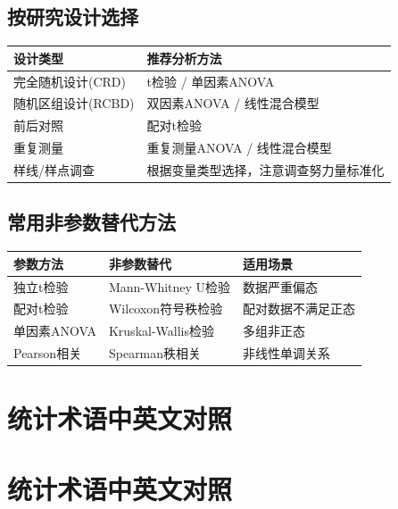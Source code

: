 \documentclass[
  letterpaper,
]{scrbook}
\newcounter{none} %
\begin{document}
\section{按研究设计选择}\label{ux6309ux7814ux7a76ux8bbeux8ba1ux9009ux62e9}

{\def\LTcaptype{none} %
\begin{longtable}[]{@{}ll@{}}
\toprule\noalign{}
设计类型 & 推荐分析方法 \\
\midrule\noalign{}
\endhead
\bottomrule\noalign{}
\endlastfoot
完全随机设计(CRD) & t检验 / 单因素ANOVA \\
随机区组设计(RCBD) & 双因素ANOVA / 线性混合模型 \\
前后对照 & 配对t检验 \\
重复测量 & 重复测量ANOVA / 线性混合模型 \\
样线/样点调查 & 根据变量类型选择，注意调查努力量标准化 \\
\end{longtable}
}

\section{常用非参数替代方法}\label{ux5e38ux7528ux975eux53c2ux6570ux66ffux4ee3ux65b9ux6cd5}

{\def\LTcaptype{none} %
\begin{longtable}[]{@{}lll@{}}
\toprule\noalign{}
参数方法 & 非参数替代 & 适用场景 \\
\midrule\noalign{}
\endhead
\bottomrule\noalign{}
\endlastfoot
独立t检验 & Mann-Whitney U检验 & 数据严重偏态 \\
配对t检验 & Wilcoxon符号秩检验 & 配对数据不满足正态 \\
单因素ANOVA & Kruskal-Wallis检验 & 多组非正态 \\
Pearson相关 & Spearman秩相关 & 非线性单调关系 \\
\end{longtable}
}

\chapter{统计术语中英文对照}\label{ux7edfux8ba1ux672fux8bedux4e2dux82f1ux6587ux5bf9ux7167}

\chapter{统计术语中英文对照}\label{ux7edfux8ba1ux672fux8bedux4e2dux82f1ux6587ux5bf9ux7167-1}
\end{document}
